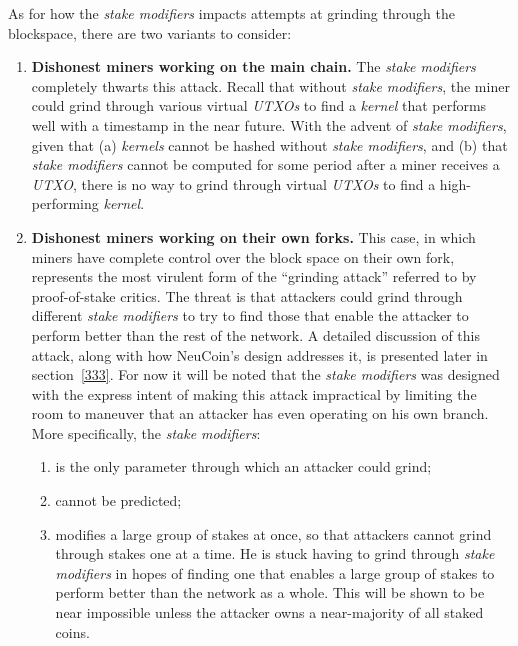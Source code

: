 \documentclass[a4paper,11pt]{article}
\begin{document}
As for how the \textit{stake modifiers} impacts attempts at grinding through the blockspace, there are two variants to consider: 
\begin{enumerate}
\setlength{\itemsep}{0pt}
\item{\textbf{Dishonest miners working on the main chain.} The \textit{stake modifiers} completely thwarts this attack. Recall that without \textit{stake modifiers}, the miner could grind through various virtual \textit{UTXOs} to find a \textit{kernel} that performs well with a timestamp in the near future. With the advent of \textit{stake modifiers}, given that (a) \textit{kernels} cannot be hashed without \textit{stake modifiers}, and (b) that \textit{stake modifiers} cannot be computed for some period after a miner receives a \textit{UTXO}, there is no way to grind through virtual \textit{UTXOs} to find a high-performing \textit{\textit{kernel}}.}
\item{\textbf{Dishonest miners working on their own forks.} This case, in which miners have complete control over the block space on their own fork, represents the most virulent form of the ``grinding attack'' referred to by proof-of-stake critics. The threat is that attackers could grind through different \textit{\textit{stake modifiers}} to try to find those that enable the attacker to perform better than the rest of the network. A detailed discussion of this attack, along with how NeuCoin's design addresses it, is presented later in section~\ref{333}. For now it will be noted that the \textit{stake modifiers} was designed with the express intent of making this attack impractical by limiting the room to maneuver that an attacker has even operating on his own branch. More specifically, the \textit{stake modifiers}:
\begin{enumerate}
\setlength{\itemsep}{0pt}
\item{is the only parameter through which an attacker could grind;}
\item{cannot be predicted;}
\item{modifies a large group of stakes at once, so that attackers cannot grind through stakes one at a time. He is stuck having to grind through \textit{\textit{stake modifiers}} in hopes of finding one that enables a large group of stakes to perform better than the network as a whole. This will be shown to be near impossible unless the attacker owns a near-majority of all staked coins.}
\end{enumerate}
}
\end{enumerate}
\end{document}

